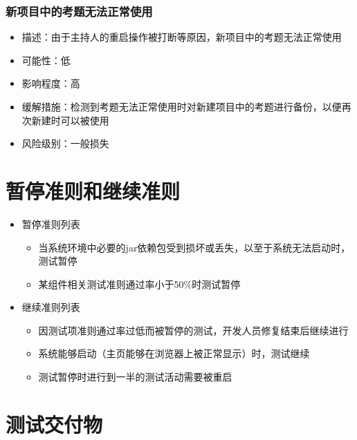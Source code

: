 \documentclass[hyperref, a4paper]{ctexart}
\providecommand{\tightlist}{%
  \setlength{\itemsep}{0pt}\setlength{\parskip}{0pt}}
\begin{document}
\hypertarget{ux65b0ux9879ux76eeux4e2dux7684ux8003ux9898ux65e0ux6cd5ux6b63ux5e38ux4f7fux7528}{%
\subsubsection{新项目中的考题无法正常使用}\label{ux65b0ux9879ux76eeux4e2dux7684ux8003ux9898ux65e0ux6cd5ux6b63ux5e38ux4f7fux7528}}

\begin{itemize}
\tightlist
\item
  描述：由于主持人的重启操作被打断等原因，新项目中的考题无法正常使用
\item
  可能性：低
\item
  影响程度：高
\item
  缓解措施：检测到考题无法正常使用时对新建项目中的考题进行备份，以便再次新建时可以被使用
\item
  风险级别：一般损失
\end{itemize}

\hypertarget{ux6682ux505cux51c6ux5219ux548cux7ee7ux7eedux51c6ux5219}{%
\section{暂停准则和继续准则}\label{ux6682ux505cux51c6ux5219ux548cux7ee7ux7eedux51c6ux5219}}

\begin{itemize}
\tightlist
\item
  暂停准则列表

  \begin{itemize}
  \tightlist
  \item
    当系统环境中必要的jar依赖包受到损坏或丢失，以至于系统无法启动时，测试暂停
  \item
    某组件相关测试准则通过率小于50\%时测试暂停
  \end{itemize}
\item
  继续准则列表

  \begin{itemize}
  \tightlist
  \item
    因测试项准则通过率过低而被暂停的测试，开发人员修复结束后继续进行
  \item
    系统能够启动（主页能够在浏览器上被正常显示）时，测试继续
  \item
    测试暂停时进行到一半的测试活动需要被重启
  \end{itemize}
\end{itemize}

\hypertarget{ux6d4bux8bd5ux4ea4ux4ed8ux7269}{%
\section{测试交付物}\label{ux6d4bux8bd5ux4ea4ux4ed8ux7269}}
\end{document}
